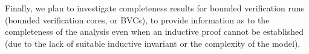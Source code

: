 Finally, we plan to investigate completeness results for bounded verification runs (bounded verification cores, or BVCs), to provide information as to the completeness of the analysis even when an inductive proof cannot be established (due to the lack of suitable inductive invariant or the complexity of the model).

